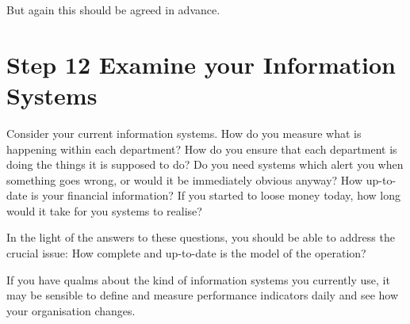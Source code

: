 But again this should be agreed in advance.

\section*{Step 12 Examine your Information Systems}
 Consider your current information systems. How do you measure what is happening within each department? How do you ensure that each department is doing the things it is supposed to do? Do you need systems which alert you when something goes wrong, or would it be immediately obvious anyway? How up-to-date is your financial information? If you started to loose money today, how long would it take for you systems to realise?
 
 In the light of the answers to these questions, you should be able to address the crucial issue: How complete and up-to-date is the model of the operation?

If you have qualms about the kind of information systems you currently use, it may be sensible to define and measure performance indicators daily and see how your organisation changes.